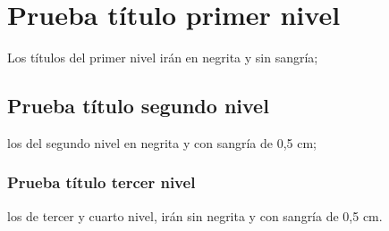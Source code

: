 \section{Prueba título primer nivel}
Los títulos  del primer nivel irán en negrita y sin sangría;

\subsection{Prueba título segundo nivel}
los del segundo nivel en negrita y con sangría de 0,5 cm;

\subsubsection{Prueba título tercer nivel}
los de tercer y cuarto nivel, irán sin negrita y con sangría de 0,5 cm.
